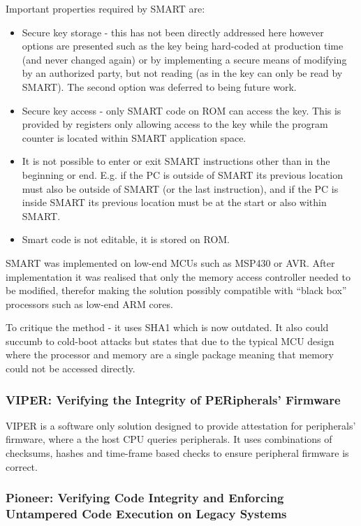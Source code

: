 Important properties required by SMART are:
\begin{itemize}
	\item Secure key storage - this has not been directly addressed here however options are presented such as the key being hard-coded at production time (and never changed again) or by implementing a secure means of modifying by an authorized party, but not reading (as in the key can only be read by SMART). The second option was deferred to being future work.
	\item Secure key access - only SMART code on ROM can access the key. This is provided by registers only allowing access to the key while the program counter is located within SMART application space.
	\item It is not possible to enter or exit SMART instructions other than in the beginning or end. E.g. if the PC is outside of SMART its previous location must also be outside of SMART (or the last instruction), and if the PC is inside SMART its previous location must be at the start or also within SMART.
	\item Smart code is not editable, it is stored on ROM.
\end{itemize}

SMART was implemented on low-end MCUs such as MSP430 or AVR. After implementation it was realised that only the memory access controller needed to be modified, therefor making the solution possibly compatible with “black box” processors such as low-end ARM cores.

To critique the method - it uses SHA1 which is now outdated. It also could succumb to cold-boot attacks but states that due to the typical MCU design where the processor and memory are a single package meaning that memory could not be accessed directly.

\subsubsection{VIPER: Verifying the Integrity of PERipherals’ Firmware}

VIPER \cite{Li2011} is a software only solution designed to provide attestation for peripherals’ firmware, where a the host CPU queries peripherals. It uses combinations of checksums, hashes and time-frame based checks to ensure peripheral firmware is correct.

\subsubsection{Pioneer: Verifying Code Integrity and Enforcing Untampered Code Execution on Legacy Systems}

